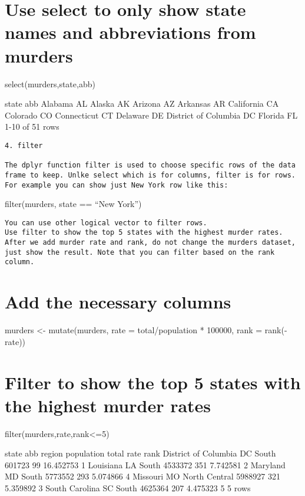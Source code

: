 \documentclass[
]{article}
\begin{document}
\hypertarget{use-select-to-only-show-state-names-and-abbreviations-from-murders}{%
\section{Use select to only show state names and abbreviations from
murders}\label{use-select-to-only-show-state-names-and-abbreviations-from-murders}}

select(murders,state,abb)

state abb Alabama AL Alaska AK Arizona AZ Arkansas AR California CA
Colorado CO Connecticut CT Delaware DE District of Columbia DC Florida
FL 1-10 of 51 rows

\begin{verbatim}
4. filter
    
The dplyr function filter is used to choose specific rows of the data frame to keep. Unlke select which is for columns, filter is for rows. For example you can show just New York row like this:
\end{verbatim}

filter(murders, state == ``New York'')

\begin{verbatim}
You can use other logical vector to filter rows.
Use filter to show the top 5 states with the highest murder rates. After we add murder rate and rank, do not change the murders dataset, just show the result. Note that you can filter based on the rank column.
\end{verbatim}

\hypertarget{add-the-necessary-columns}{%
\section{Add the necessary columns}\label{add-the-necessary-columns}}

murders \textless- mutate(murders, rate = total/population * 100000,
rank = rank(-rate))

\hypertarget{filter-to-show-the-top-5-states-with-the-highest-murder-rates}{%
\section{Filter to show the top 5 states with the highest murder
rates}\label{filter-to-show-the-top-5-states-with-the-highest-murder-rates}}

filter(murders,rate,rank\textless=5)

state abb region population total rate rank District of Columbia DC
South 601723 99 16.452753 1 Louisiana LA South 4533372 351 7.742581 2
Maryland MD South 5773552 293 5.074866 4 Missouri MO North Central
5988927 321 5.359892 3 South Carolina SC South 4625364 207 4.475323 5 5
rows
\end{document}
